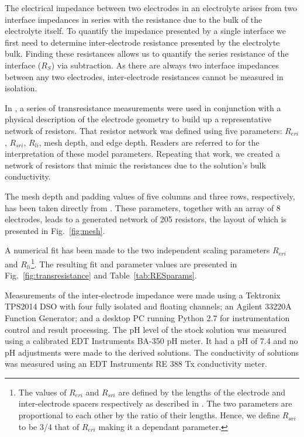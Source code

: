 \documentclass[journal, a4paper]{IEEEtran}
\begin{document}
The electrical impedance between two electrodes in an electrolyte arises from two interface impedances in series with the resistance due to the bulk of the electrolyte itself.
To quantify the impedance presented by a single interface we first need to determine inter-electrode resistance presented by the electrolyte bulk.
Finding these resistances allows us to quantify the series resistance of the interface ($R_{S}$) via subtraction.
As there are always two interface impedances between any two electrodes, inter-electrode resistances cannot be measured in isolation.

In \cite{ScottSingle2013}, a series of transresistance measurements were used in conjunction with a physical description of the electrode geometry to build up a representative network of resistors.
That resistor network was defined using five parameters: $R_{eri}$, $R_{sri}$, $R_{li}$, mesh depth, and edge depth.
Readers are referred to \cite{ScottSingle2013} for the interpretation of these model parameters.
Repeating that work, we created a network of resistors that mimic the resistances due to the solution's bulk conductivity.

The mesh depth and padding values of five columns and three rows, respectively, has been taken directly from \cite{ScottSingle2013}.
These parameters, together with an array of 8 electrodes, leads to a generated network of 205 resistors, the layout of which is presented in Fig.~\ref{fig:mesh}.

A numerical fit has been made to the two independent scaling parameters $R_{eri}$ and $R_{li}$\footnote{The values of $R_{eri}$ and $R_{sri}$ are defined by the lengths of the electrode and inter-electrode spacers respectively as described in \cite{ScottSingle2013}.
The two parameters are proportional to each other by the ratio of their lengths.
Hence, we define $R_{sri}$ to be 3/4 that of $R_{eri}$ making it a dependant parameter.}.
The resulting fit and parameter values are presented in Fig.~\ref{fig:transresistance} and Table~\ref{tab:RESparams}.

Measurements of the inter-electrode impedance were made using a Tektronix TPS2014 DSO with four fully isolated and floating channels; an Agilent 33220A Function Generator; and a desktop PC running Python 2.7 for instrumentation control and result processing.
The pH level of the stock solution was measured using a calibrated EDT Instruments BA-350 pH meter.
It had a pH of 7.4 and no pH adjustments were made to the derived solutions.
The conductivity of solutions was measured using an EDT Instruments RE 388 Tx conductivity meter.
\end{document}
